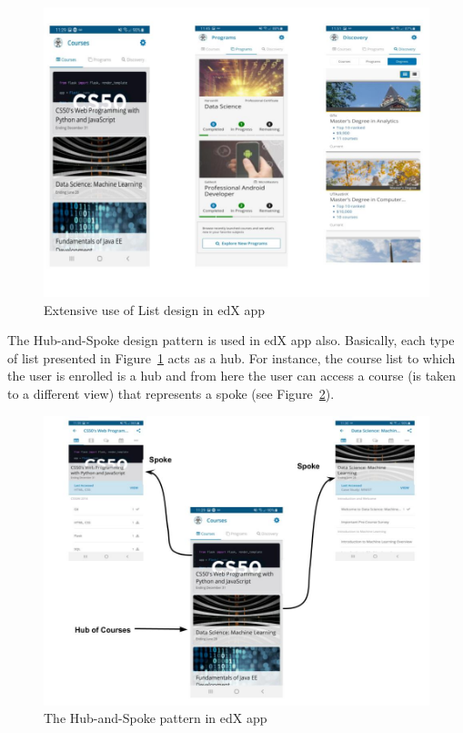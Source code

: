 \documentclass[version=last,fontsize=13pt]{scrartcl}
\begin{document}
		\begin{figure}[H]

			\centering	
			\includegraphics[scale = 0.4]{./imgs/Lists_edX.jpg}
			\caption{Extensive use of List design in edX app}
			\label{eU}

		\end{figure}

		The Hub-and-Spoke design pattern is used in edX app also. Basically, each type of list  presented in Figure~\ref{eU} acts as a hub. For instance, the course list to which the user is enrolled is a hub and from here the user can access a course (is taken to a different view) that represents a spoke (see Figure~\ref{hsE}).

		\begin{figure}[H]

			\centering	
			\includegraphics[scale = 0.4]{./imgs/hubAndSpokeEdX.jpg}
			\caption{The Hub-and-Spoke pattern in edX app}
			\label{hsE}

		\end{figure}
\end{document}
